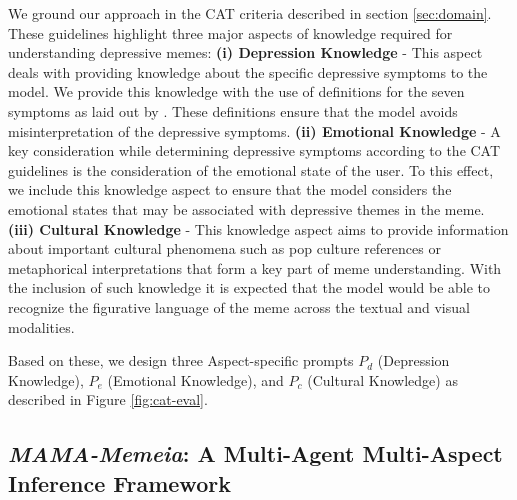 \documentclass[letterpaper]{article} %
\newcommand{\model}{\textit{MAMA-Memeia}}
\begin{document}
We ground our approach in the CAT criteria described in section \ref{sec:domain}. These guidelines highlight three major aspects of knowledge required for understanding depressive memes: 
\newline\textbf{(i) Depression Knowledge} -  This aspect deals with providing knowledge about the specific depressive symptoms to the model. We provide this knowledge with the use of definitions for the seven symptoms as laid out by \citep{Yadav-etal-2023-towards}. These definitions ensure that the model avoids misinterpretation of the depressive symptoms. 
\newline\textbf{(ii) Emotional Knowledge} - A key consideration while determining depressive symptoms according to the CAT guidelines is the consideration of the emotional state of the user. To this effect, we include this knowledge aspect to ensure that the model considers the emotional states that may be associated with depressive themes in the meme.
\newline\textbf{(iii) Cultural Knowledge} - This knowledge aspect aims to provide information about important cultural phenomena such as pop culture references or metaphorical interpretations that form a key part of meme understanding. With the inclusion of such knowledge it is expected that the model would be able to recognize the figurative language of the meme across the textual and visual modalities.

Based on these, we design three Aspect-specific prompts $P_d$ (Depression Knowledge), $P_e$ (Emotional Knowledge), and $P_c$ (Cultural Knowledge) as described in Figure \ref{fig:cat-eval}.

\subsection{\model: A Multi-Agent Multi-Aspect Inference Framework}
\end{document}
